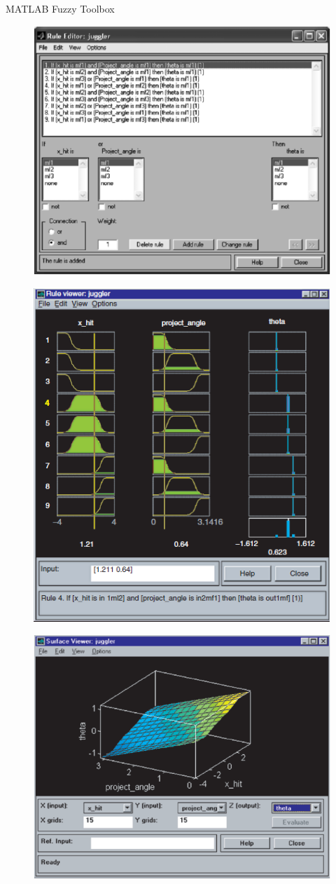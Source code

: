 \documentclass[hyperref={unicode}]{beamer}
\begin{document}
\begin{frame}[allowframebreaks]{MATLAB Fuzzy Toolbox}
\begin{figure}
	\end{figure}
	\begin{figure}
	\includegraphics[width=.75\textwidth]{sw-4}
	\end{figure}
	\begin{figure}
	\includegraphics[width=.5\textwidth]{sw-5}
	\end{figure}
	\begin{figure}
	\includegraphics[width=.75\textwidth]{sw-6}
	\end{figure}
\end{frame}
\end{document}
